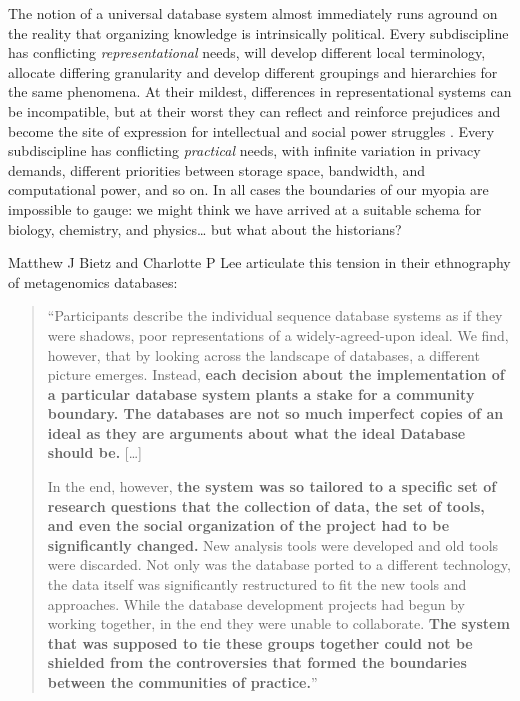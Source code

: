 The notion of a universal database system almost immediately runs
aground on the reality that organizing knowledge is intrinsically
political. Every subdiscipline has conflicting \emph{representational}
needs, will develop different local terminology, allocate differing
granularity and develop different groupings and hierarchies for the same
phenomena. At their mildest, differences in representational systems can
be incompatible, but at their worst they can reflect and reinforce
prejudices and become the site of expression for intellectual and social
power struggles \citep{joLessonsArchivesStrategies2020, selbstFairnessAbstractionSociotechnical2019, gebruDatasheetsDatasets2021, bowkerSortingThingsOut1999} . Every subdiscipline has conflicting
\emph{practical} needs, with infinite variation in privacy demands,
different priorities between storage space, bandwidth, and computational
power, and so on. In all cases the boundaries of our myopia are
impossible to gauge: we might think we have arrived at a suitable schema
for biology, chemistry, and physics\ldots{} but what about the
historians?

Matthew J Bietz and Charlotte P Lee articulate this tension in their
ethnography of metagenomics databases:

\begin{quote}
``Participants describe the individual sequence database systems as if
they were shadows, poor representations of a widely-agreed-upon ideal.
We find, however, that by looking across the landscape of databases, a
different picture emerges. Instead, \textbf{each decision about the
implementation of a particular database system plants a stake for a
community boundary. The databases are not so much imperfect copies of an
ideal as they are arguments about what the ideal Database should be.}
{[}\ldots{]}

In the end, however, \textbf{the system was so tailored to a specific
set of research questions that the collection of data, the set of tools,
and even the social organization of the project had to be significantly
changed.} New analysis tools were developed and old tools were
discarded. Not only was the database ported to a different technology,
the data itself was significantly restructured to fit the new tools and
approaches. While the database development projects had begun by working
together, in the end they were unable to collaborate. \textbf{The system
that was supposed to tie these groups together could not be shielded
from the controversies that formed the boundaries between the
communities of practice.}'' \citep{bietzCollaborationMetagenomicsSequence2009} 
\end{quote}

